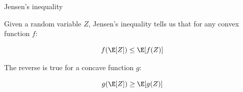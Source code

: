 \begin{frame}{\subsecname}

\svspace{-5mm}



\begin{block}{Jensen's inequality}

Given a random variable $Z$, Jensen's inequality tells us that for any convex function $f$:


\svspace{-5mm}

\begin{equation}
f(\E[Z]) \leq \E[f(Z)]    
\end{equation}
  
\pause

The reverse is true for a concave function $g$:
  
\begin{equation}
g(\E[Z]) \geq \E[g(Z)]    
\end{equation}

\end{block}


\end{frame}
